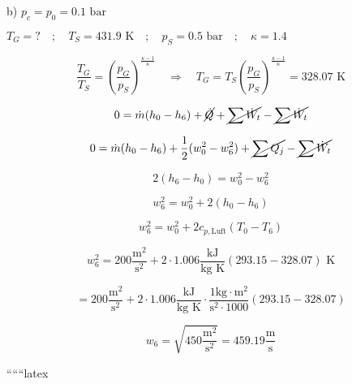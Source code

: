 b) $p_c = p_0 = 0.1 \text{ bar}$

$T_G = ? \quad ; \quad T_S = 431.9 \text{ K} \quad ; \quad p_S = 0.5 \text{ bar} \quad ; \quad \kappa = 1.4$


\[
\frac{T_G}{T_S} = \left( \frac{p_G}{p_S} \right)^{\frac{\kappa - 1}{\kappa}} \quad \Rightarrow \quad T_G = T_S \left( \frac{p_G}{p_S} \right)^{\frac{\kappa - 1}{\kappa}} = 328.07 \text{ K}
\]


\[
0 = \dot{m} (h_0 - h_6) + \cancel{\dot{Q}} + \cancel{\sum \dot{W}_t} - \cancel{\sum \dot{W}_t}
\]

\[
0 = \dot{m} (h_0 - h_6) + \frac{1}{2} (w_0^2 - w_6^2) + \cancel{\sum Q_j} - \cancel{\sum \dot{W}_t}
\]

 \rightarrow {}

\[
2(h_6 - h_0) = w_0^2 - w_6^2
\]

\[
w_6^2 = w_0^2 + 2(h_0 - h_6)
\]

\[
w_6^2 = w_0^2 + 2 c_{p,\text{Luft}} (T_0 - T_6)
\]

\[
w_6^2 = 200 \frac{\text{m}^2}{\text{s}^2} + 2 \cdot 1.006 \frac{\text{kJ}}{\text{kg K}} (293.15 - 328.07) \text{ K}
\]

\[
= 200 \frac{\text{m}^2}{\text{s}^2} + 2 \cdot 1.006 \frac{\text{kJ}}{\text{kg K}} \cdot \frac{1 \text{kg} \cdot \text{m}^2}{\text{s}^2 \cdot 1000} (293.15 - 328.07)
\]

\[
w_6 = \sqrt{450 \frac{\text{m}^2}{\text{s}^2}} = 459.19 \frac{\text{m}}{\text{s}}
\]

``````latex